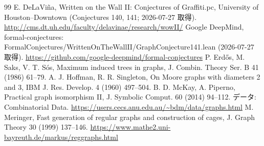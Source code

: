 \documentclass[paper=a4,fontsize=10.5pt,jafontsize=10.5pt]{jlreq}
\theoremstyle{plain}
\theoremstyle{definition}
\begin{document}
\begin{thebibliography}{99}
 E. DeLaViña, Written on the Wall II: Conjectures of Graffiti.pc, University of Houston--Downtown (Conjectures 140, 141; 2026-07-27 取得). \url{http://cms.dt.uh.edu/faculty/delavinae/research/wowII/}
 Google DeepMind, formal-conjectures: FormalConjectures/WrittenOnTheWallII/GraphConjecture141.lean (2026-07-27 取得). \url{https://github.com/google-deepmind/formal-conjectures}
 P. Erdős, M. Saks, V. T. Sós, Maximum induced trees in graphs, J. Combin. Theory Ser. B 41 (1986) 61--79.
 A. J. Hoffman, R. R. Singleton, On Moore graphs with diameters 2 and 3, IBM J. Res. Develop. 4 (1960) 497--504.
 B. D. McKay, A. Piperno, Practical graph isomorphism II, J. Symbolic Comput. 60 (2014) 94--112. データ: Combinatorial Data. \url{https://users.cecs.anu.edu.au/~bdm/data/graphs.html}
 M. Meringer, Fast generation of regular graphs and construction of cages, J. Graph Theory 30 (1999) 137--146. \url{https://www.mathe2.uni-bayreuth.de/markus/reggraphs.html}
\end{thebibliography}
\end{document}
